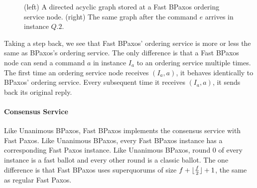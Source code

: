 \begin{figure}[h]
  \centering

  \begin{subfigure}[b]{0.35\textwidth}
    \caption{}
  \end{subfigure}
  \begin{subfigure}[b]{0.35\textwidth}
    \caption{}
  \end{subfigure}

  \caption{%
    (left) A directed acyclic graph stored at a Fast BPaxos ordering service
    node. (right) The same graph after the command $e$ arrives in instance
    $Q.2$.
  }
\end{figure}

Taking a step back, we see that Fast BPaxos' ordering service is more or less
the same as BPaxos's ordering service. The only difference is that a Fast
BPaxos node can send a command $a$ in instance $I_a$ to an ordering service
multiple times. The first time an ordering service node receives $(I_a, a)$, it
behaves identically to BPaxos' ordering service. Every subsequent time it
receives $(I_a, a)$, it sends back its original reply.

\paragraph{Consensus Service}
Like Unanimous BPaxos, Fast BPaxos implements the consensus service with Fast
Paxos. Like Unanimous BPaxos, every Fast BPaxos instance has a corresponding
Fast Paxos instance. Like Unanimous BPaxos, round 0 of every instance is a
fast ballot and every other round is a classic ballot.
%
The one difference is that Fast BPaxos uses superquorums of size $f +
\lfloor\frac{f}{2}\rfloor + 1$, the same as regular Fast Paxos.

